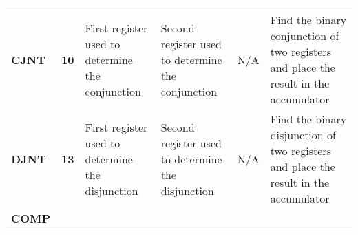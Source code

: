 \documentclass[]{article}
\begin{document}
\begin{longtable}[c]{@{}llllll@{}}
\begin{minipage}[t]{0.14\columnwidth}
\strut\end{minipage}\tabularnewline
\begin{minipage}[t]{0.14\columnwidth}\raggedright\strut
\textbf{CJNT}
\strut\end{minipage} &
\begin{minipage}[t]{0.14\columnwidth}\raggedright\strut
\textbf{10}
\strut\end{minipage} &
\begin{minipage}[t]{0.14\columnwidth}\raggedright\strut
First register used to determine the conjunction
\strut\end{minipage} &
\begin{minipage}[t]{0.14\columnwidth}\raggedright\strut
Second register used to determine the conjunction
\strut\end{minipage} &
\begin{minipage}[t]{0.14\columnwidth}\raggedright\strut
N/A
\strut\end{minipage} &
\begin{minipage}[t]{0.14\columnwidth}\raggedright\strut
Find the binary conjunction of two registers and place the result in the
accumulator
\strut\end{minipage}\tabularnewline
\begin{minipage}[t]{0.14\columnwidth}\raggedright\strut
\textbf{DJNT}
\strut\end{minipage} &
\begin{minipage}[t]{0.14\columnwidth}\raggedright\strut
\textbf{13}
\strut\end{minipage} &
\begin{minipage}[t]{0.14\columnwidth}\raggedright\strut
First register used to determine the disjunction
\strut\end{minipage} &
\begin{minipage}[t]{0.14\columnwidth}\raggedright\strut
Second register used to determine the disjunction
\strut\end{minipage} &
\begin{minipage}[t]{0.14\columnwidth}\raggedright\strut
N/A
\strut\end{minipage} &
\begin{minipage}[t]{0.14\columnwidth}\raggedright\strut
Find the binary disjunction of two registers and place the result in the
accumulator
\strut\end{minipage}\tabularnewline
\begin{minipage}[t]{0.14\columnwidth}\raggedright\strut
\textbf{COMP}
\strut\end{minipage} &

\end{longtable}
\end{document}

